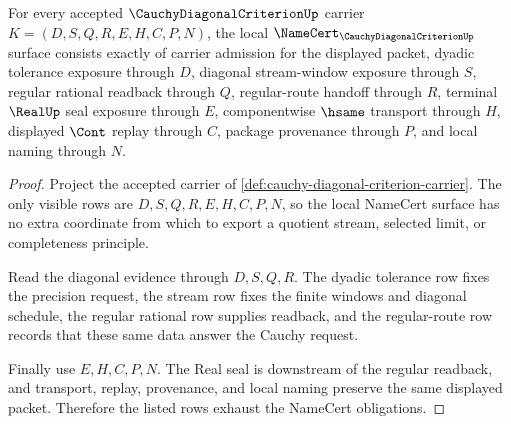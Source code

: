 \begin{theorem}
\label{thm:cauchy-diagonal-criterion-namecert-obligations}
For every accepted $\CauchyDiagonalCriterionUp$ carrier $K=(D,S,Q,R,E,H,C,P,N)$, the local $\NameCert_{\CauchyDiagonalCriterionUp}$ surface consists exactly of carrier admission for the displayed packet, dyadic tolerance exposure through $D$, diagonal stream-window exposure through $S$, regular rational readback through $Q$, regular-route handoff through $R$, terminal $\RealUp$ seal exposure through $E$, componentwise $\hsame$ transport through $H$, displayed $\Cont$ replay through $C$, package provenance through $P$, and local naming through $N$.
\end{theorem}
\begin{proof}
Project the accepted carrier of \autoref{def:cauchy-diagonal-criterion-carrier}. The only visible rows are $D,S,Q,R,E,H,C,P,N$, so the local NameCert surface has no extra coordinate from which to export a quotient stream, selected limit, or completeness principle.

Read the diagonal evidence through $D,S,Q,R$. The dyadic tolerance row fixes the precision request, the stream row fixes the finite windows and diagonal schedule, the regular rational row supplies readback, and the regular-route row records that these same data answer the Cauchy request.

Finally use $E,H,C,P,N$. The Real seal is downstream of the regular readback, and transport, replay, provenance, and local naming preserve the same displayed packet. Therefore the listed rows exhaust the NameCert obligations.
\end{proof}

